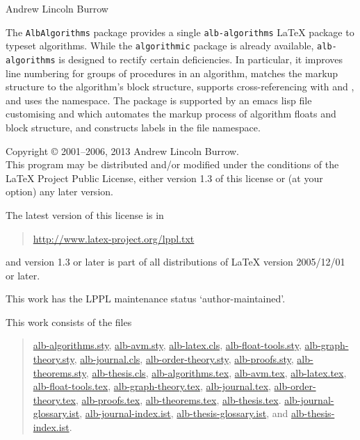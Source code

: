 \documentclass[11pt,a4paper,oneside,titlepage]{alb-latex}
\begin{document}


\begin{albTitlePage}


  Andrew Lincoln Burrow


  The \texttt{AlbAlgorithms} package provides a single
  \texttt{alb-algorithms} \LaTeX{} package to typeset algorithms.  While
  the \texttt{algorithmic} package is already available,
  \texttt{alb-algorithms} is designed to rectify certain deficiencies.
  In particular, it improves line numbering for groups of procedures in
  an algorithm, matches the markup structure to the algorithm's block
  structure, supports cross-referencing with \AUCTeX{} and \RefTeX{},
  and uses the \albLogo{} namespace.  The package is supported by an
  emacs lisp file customising \AUCTeX{} and \RefTeX{} which automates
  the markup process of algorithm floats and block structure, and
  constructs labels in the file namespace.



  Copyright \copyright{} 2001--2006, 2013 Andrew Lincoln Burrow.\\
  This program may be distributed and/or modified under the conditions
  of the \LaTeX{} Project Public License, either version 1.3 of this
  license or (at your option) any later version.

  \medskip{}

  The latest version of this license is in
  \begin{quote}
    \url{http://www.latex-project.org/lppl.txt}
  \end{quote}
  and version 1.3 or later is part of all distributions of LaTeX version
  2005/12/01 or later.

  \medskip{}

  This work has the LPPL maintenance status `author-maintained'.

  \medskip{}

  This work consists of the files
  \begin{quote}
    \begin{flushleft}
      \url{alb-algorithms.sty}, \url{alb-avm.sty}, \url{alb-latex.cls},
      \url{alb-float-tools.sty}, \url{alb-graph-theory.sty},
      \url{alb-journal.cls}, \url{alb-order-theory.sty},
      \url{alb-proofs.sty}, \url{alb-theorems.sty},
      \url{alb-thesis.cls}, \url{alb-algorithms.tex}, \url{alb-avm.tex},
      \url{alb-latex.tex}, \url{alb-float-tools.tex},
      \url{alb-graph-theory.tex}, \url{alb-journal.tex},
      \url{alb-order-theory.tex}, \url{alb-proofs.tex},
      \url{alb-theorems.tex}, \url{alb-thesis.tex}.
      \url{alb-journal-glossary.ist}, \url{alb-journal-index.ist},
      \url{alb-thesis-glossary.ist}, and \url{alb-thesis-index.ist}.
    \end{flushleft}
  \end{quote}



\end{albTitlePage}
\end{document}
